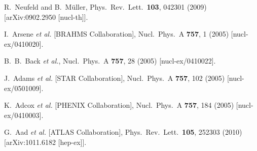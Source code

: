 \documentclass[letter,11pt]{article}
\begin{document}
\begin{thebibliography}{99}
R.~Neufeld and B.~M\"uller,
Phys.\ Rev.\ Lett.\  \textbf{103}, 042301 (2009)
[arXiv:0902.2950 [nucl-th]].

  I.~Arsene {\it et al.} [BRAHMS Collaboration],
  Nucl.\ Phys.\ A {\bf 757}, 1 (2005)
  [nucl-ex/0410020].
  
  B.~B.~Back {\it et al.},
  Nucl.\ Phys.\ A {\bf 757}, 28 (2005)
  [nucl-ex/0410022].

  J.~Adams {\it et al.} [STAR Collaboration],
  Nucl.\ Phys.\ A {\bf 757}, 102 (2005)
  [nucl-ex/0501009].

  K.~Adcox {\it et al.} [PHENIX Collaboration],
  Nucl.\ Phys.\ A {\bf 757}, 184 (2005)
  [nucl-ex/0410003].

  G.~Aad {\it et al.} [ATLAS Collaboration],
  Phys.\ Rev.\ Lett.\  {\bf 105}, 252303 (2010)
  [arXiv:1011.6182 [hep-ex]].


\end{thebibliography}
\end{document}
